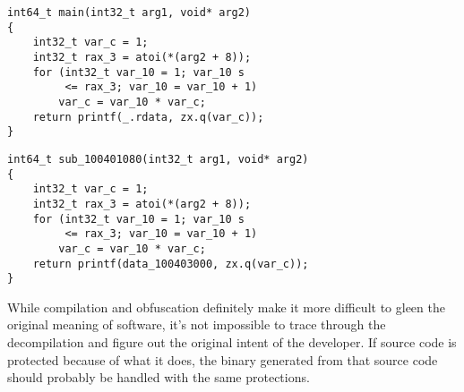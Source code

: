 \begin{minipage}{.45\textwidth}
\begin{lstlisting}[caption={Unstripped Decompilation with Binary Ninja},captionpos=b,style=CStyle,basicstyle=\scriptsize,label={lst:20210802:ninja}]
int64_t main(int32_t arg1, void* arg2)
{
	int32_t var_c = 1;
	int32_t rax_3 = atoi(*(arg2 + 8));
	for (int32_t var_10 = 1; var_10 s
	     <= rax_3; var_10 = var_10 + 1)
		var_c = var_10 * var_c;
	return printf(_.rdata, zx.q(var_c));
}
\end{lstlisting}
\end{minipage}
\begin{minipage}{.45\textwidth}
\begin{lstlisting}[caption={Stripped Decompilation with Binary Ninja},captionpos=b,style=CStyle,basicstyle=\scriptsize,label={lst:20210802:ninja2}]
int64_t sub_100401080(int32_t arg1, void* arg2)
{
	int32_t var_c = 1;
	int32_t rax_3 = atoi(*(arg2 + 8));
	for (int32_t var_10 = 1; var_10 s
	     <= rax_3; var_10 = var_10 + 1)
		var_c = var_10 * var_c;
	return printf(data_100403000, zx.q(var_c));
}
\end{lstlisting}
\end{minipage}

While compilation and obfuscation definitely make it more difficult to gleen the original meaning of software, it's not impossible to trace through the decompilation and figure out the original intent of the developer. If source code is protected because of what it does, the binary generated from that source code should probably be handled with the same protections.
